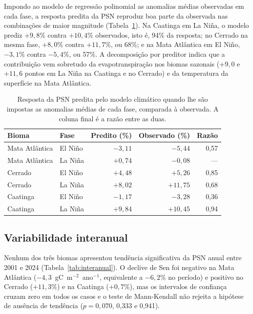 \documentclass[a4paper,fleqn]{cas-sc}
\begin{document}
Impondo ao modelo de regressão polinomial as anomalias médias observadas em cada fase, a resposta predita da PSN reproduz boa parte da observada nas combinações de maior magnitude (Tabela~\ref{tab:mediacao}). Na Caatinga em La Niña, o modelo prediz $+9{,}8\%$ contra $+10{,}4\%$ observados, isto é, 94\% da resposta; no Cerrado na mesma fase, $+8{,}0\%$ contra $+11{,}7\%$, ou 68\%; e na Mata Atlântica em El Niño, $-3{,}1\%$ contra $-5{,}4\%$, ou 57\%. A decomposição por preditor indica que a contribuição vem sobretudo da evapotranspiração nos biomas sazonais ($+9{,}0$ e $+11{,}6$ pontos em La Niña na Caatinga e no Cerrado) e da temperatura da superfície na Mata Atlântica.

\begin{table}[width=\linewidth,cols=5,pos=h]
\caption{Resposta da PSN predita pelo modelo climático quando lhe são impostas as anomalias médias de cada fase, comparada à observada. A coluna final é a razão entre as duas.}
\label{tab:mediacao}
\begin{tabular*}{\tblwidth}{@{}llrrr@{}}
\toprule
Bioma & Fase & Predito (\%) & Observado (\%) & Razão \\
\midrule
Mata Atlântica & El Niño & $-3{,}11$ & $-5{,}44$  & 0,57 \\
Mata Atlântica & La Niña & $+0{,}74$ & $-0{,}08$  & --- \\
Cerrado        & El Niño & $+4{,}48$ & $+5{,}26$  & 0,85 \\
Cerrado        & La Niña & $+8{,}02$ & $+11{,}75$ & 0,68 \\
Caatinga       & El Niño & $-1{,}17$ & $-3{,}28$  & 0,36 \\
Caatinga       & La Niña & $+9{,}84$ & $+10{,}45$ & 0,94 \\
\bottomrule
\end{tabular*}
\end{table}

\subsection{Variabilidade interanual}

Nenhum dos três biomas apresentou tendência significativa da PSN anual entre 2001 e 2024 (Tabela~\ref{tab:interanual}). O declive de Sen foi negativo na Mata Atlântica ($-4{,}3$~gC~m$^{-2}$~ano$^{-1}$, equivalente a $-6{,}2\%$ no período) e positivo no Cerrado ($+11{,}3\%$) e na Caatinga ($+0{,}7\%$), mas os intervalos de confiança cruzam zero em todos os casos e o teste de Mann-Kendall não rejeita a hipótese de ausência de tendência ($p = 0{,}070$, 0,333 e 0,941).
\end{document}
